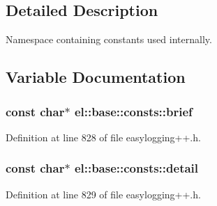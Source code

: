\subsection{Detailed Description}
Namespace containing constants used internally. 

\subsection{Variable Documentation}
\hypertarget{namespaceel_1_1base_1_1consts_a4f2c476d5b8958d5e3e7bb9d1935dea1}{}
\subsubsection[{brief}]{\setlength{\rightskip}{0pt plus 5cm}const char$\ast$ el\+::base\+::consts\+::brief}\label{namespaceel_1_1base_1_1consts_a4f2c476d5b8958d5e3e7bb9d1935dea1}


Definition at line 828 of file easylogging++.\+h.

\hypertarget{namespaceel_1_1base_1_1consts_a2b4b9cbcbf8c93a7e770c7d9efe33560}{}
\subsubsection[{detail}]{\setlength{\rightskip}{0pt plus 5cm}const char$\ast$ el\+::base\+::consts\+::detail}\label{namespaceel_1_1base_1_1consts_a2b4b9cbcbf8c93a7e770c7d9efe33560}


Definition at line 829 of file easylogging++.\+h.

\hypertarget{namespaceel_1_1base_1_1consts_ae148ad63452cb04651a6abe4f6b3f39c}{}

